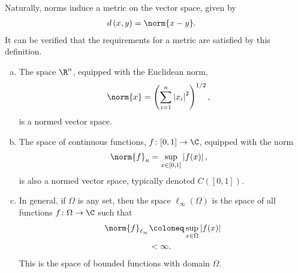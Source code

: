 \documentclass[10pt]{mypackage2}
\begin{document}
\begin{remark}
  Naturally, norms induce a metric on the vector space, given by
  \begin{align*}
    d\left( x,y \right) &= \norm{x-y}.
  \end{align*}
  It can be verified that the requirements for a metric are satisfied by this definition.
\end{remark}
\begin{example}\hfill
  \begin{enumerate}[(a)]
    \item The space $\R^n$, equipped with the Euclidean norm,
      \begin{align*}
        \norm{x} &= \left( \sum_{i=1}^{n}\left\vert x_i \right\vert^2 \right)^{1/2},
      \end{align*}
      is a normed vector space.
    \item The space of continuous functions, $f\colon [0,1]\rightarrow \C$, equipped with the norm
      \begin{align*}
        \norm{f}_{u} &= \sup_{x\in[0,1]}\left\vert f(x) \right\vert,
      \end{align*}
      is also a normed vector space, typically denoted $C\left( [0,1] \right)$.
    \item In general, if $\Omega$ is any set, then the space $\ell_{\infty}\left(\Omega\right)$ is the space of all functions $f\colon \Omega\rightarrow \C$ such that
      \begin{align*}
        \norm{f}_{\ell_{\infty}} &\coloneq \sup_{x\in\Omega}\left\vert f(x) \right\vert\\
                                 &< \infty.
      \end{align*}
      This is the space of bounded functions with domain $\Omega$.
  \end{enumerate}
\end{example}
\end{document}
